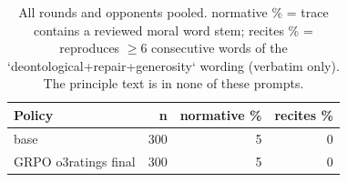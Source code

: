 \begin{table}[t]
\centering
\caption{All rounds and opponents pooled. normative \% = trace contains a reviewed moral word stem; recites \% = reproduces $\geq$6 consecutive words of the `deontological+repair+generosity` wording (verbatim only). The principle text is in none of these prompts.}
\label{tab:mr-traces}
\small
\setlength{\tabcolsep}{3.5pt}
\begin{tabular}{lrrr}
\toprule
Policy & n & normative \% & recites \% \\
\midrule
base & 300 & 5 & 0 \\
GRPO o3ratings final & 300 & 5 & 0 \\
\bottomrule
\end{tabular}
\end{table}
